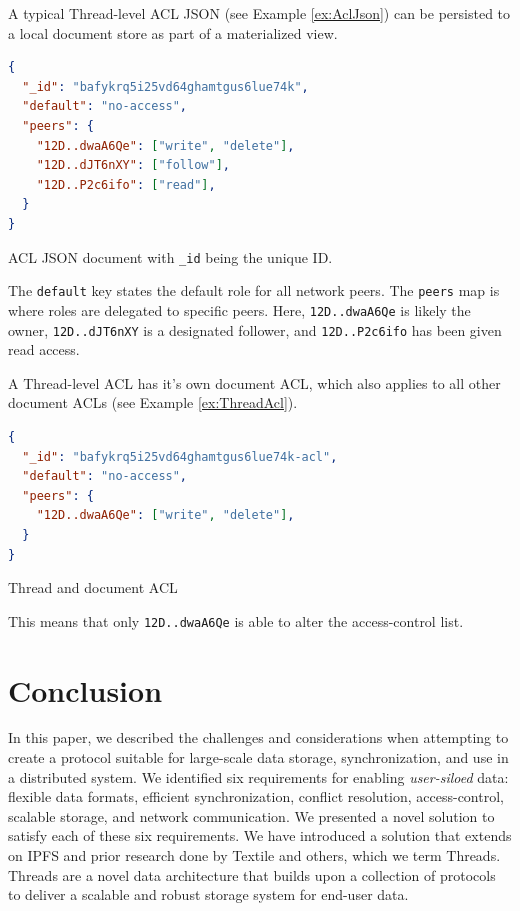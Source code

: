 \documentclass{textile}
\begin{document}
A typical Thread-level ACL JSON (see Example \ref{ex:AclJson}) can be persisted to a local document store as part of a materialized view.

\begin{example}
\begin{minipage}{.45\textwidth}
\begin{lstlisting}[language=json,firstnumber=1]
{
  "_id": "bafykrq5i25vd64ghamtgus6lue74k",
  "default": "no-access",
  "peers": {
    "12D..dwaA6Qe": ["write", "delete"],
    "12D..dJT6nXY": ["follow"],
    "12D..P2c6ifo": ["read"],
  }
}
\end{lstlisting}
\caption{ACL JSON document with \texttt{\_id} being the unique ID. }
 \label{ex:AclJson}
\end{minipage}
\end{example}

The \texttt{default} key states the default role for all network peers. The \texttt{peers} map is where roles are delegated to specific peers. Here, \texttt{12D..dwaA6Qe} is likely the owner, \texttt{12D..dJT6nXY} is a designated follower, and \texttt{12D..P2c6ifo} has been given read access.

 A Thread-level ACL has it's own document ACL, which also applies to all other document ACLs (see Example \ref{ex:ThreadAcl}).

\begin{example}
\begin{lstlisting}[language=json,firstnumber=1]
{
  "_id": "bafykrq5i25vd64ghamtgus6lue74k-acl",
  "default": "no-access",
  "peers": {
    "12D..dwaA6Qe": ["write", "delete"],
  }
}
\end{lstlisting}
\caption{Thread and document ACL}
\label{ex:ThreadAcl}
\end{example} 

This means that only \texttt{12D..dwaA6Qe} is able to alter the access-control list.

\section{Conclusion}

In this paper, we described the challenges and considerations when attempting to create a protocol suitable for large-scale data storage, synchronization, and use in a distributed system. We identified six requirements for enabling \emph{user-siloed} data: flexible data formats, efficient synchronization, conflict resolution, access-control, scalable storage, and network communication. We presented a novel solution to satisfy each of these six requirements. We have introduced a solution that extends on IPFS and prior research done by Textile and others, which we term Threads. Threads are a novel data architecture that builds upon a collection of protocols to deliver a scalable and robust storage system for end-user data. 
\end{document}
